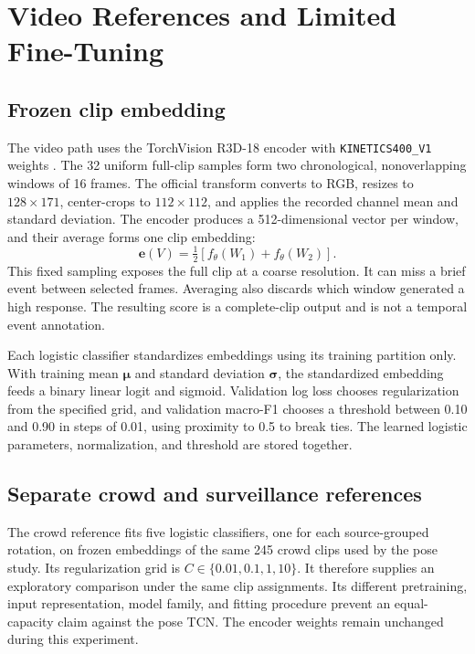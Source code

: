 \section{Video References and Limited Fine-Tuning}
\subsection{Frozen clip embedding}
The video path uses the TorchVision R3D-18 encoder with \texttt{KINETICS400\_V1} weights \cite{tran2018,torchvision,kay2017}. The 32 uniform full-clip samples form two chronological, nonoverlapping windows of 16 frames. The official transform converts to RGB, resizes to $128\times171$, center-crops to $112\times112$, and applies the recorded channel mean and standard deviation. The encoder produces a 512-dimensional vector per window, and their average forms one clip embedding:
\begin{equation}
\mathbf{e}(V)=\tfrac12\left[f_\theta(W_1)+f_\theta(W_2)\right].
\label{eq:videoembedding}
\end{equation}
This fixed sampling exposes the full clip at a coarse resolution. It can miss a brief event between selected frames. Averaging also discards which window generated a high response. The resulting score is a complete-clip output and is not a temporal event annotation.

Each logistic classifier standardizes embeddings using its training partition only. With training mean $\boldsymbol\mu$ and standard deviation $\boldsymbol\sigma$, the standardized embedding feeds a binary linear logit and sigmoid. Validation log loss chooses regularization from the specified grid, and validation macro-F1 chooses a threshold between 0.10 and 0.90 in steps of 0.01, using proximity to 0.5 to break ties. The learned logistic parameters, normalization, and threshold are stored together.

\subsection{Separate crowd and surveillance references}
The crowd reference fits five logistic classifiers, one for each source-grouped rotation, on frozen embeddings of the same 245 crowd clips used by the pose study. Its regularization grid is $C\in\{0.01,0.1,1,10\}$. It therefore supplies an exploratory comparison under the same clip assignments. Its different pretraining, input representation, model family, and fitting procedure prevent an equal-capacity claim against the pose TCN. The encoder weights remain unchanged during this experiment.

